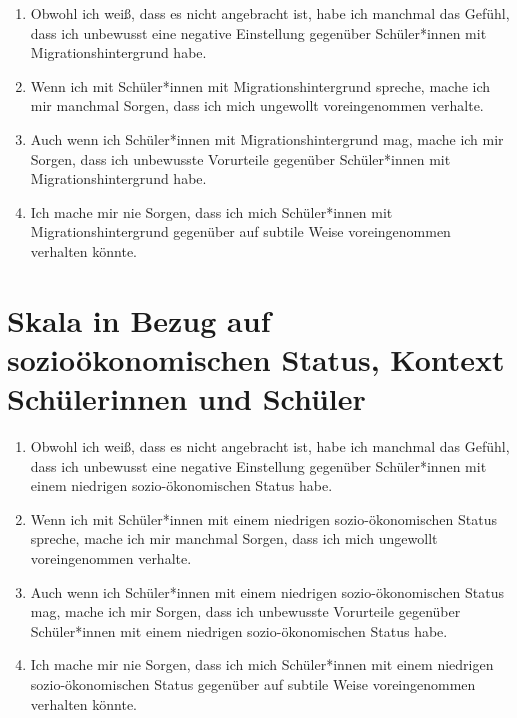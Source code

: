 \begin{enumerate}
	\item Obwohl ich weiß, dass es nicht angebracht ist, habe ich manchmal das Gefühl, dass ich unbewusst eine negative Einstellung gegenüber Schüler*innen mit Migrationshintergrund habe.
	
	\item Wenn ich mit Schüler*innen mit Migrationshintergrund spreche, mache ich mir manchmal Sorgen, dass ich mich ungewollt voreingenommen verhalte.
	
	\item Auch wenn ich Schüler*innen mit Migrationshintergrund mag, mache ich mir Sorgen, dass ich unbewusste Vorurteile gegenüber Schüler*innen mit Migrationshintergrund habe.
	
	\item Ich mache mir nie Sorgen, dass ich mich Schüler*innen mit Migrationshintergrund gegenüber auf subtile Weise voreingenommen verhalten könnte.
\end{enumerate}


\section*{Skala in Bezug auf sozioökonomischen Status, Kontext Schülerinnen und Schüler}
\label{app:skala-sozoek-sus}

\begin{enumerate}
	\item Obwohl ich weiß, dass es nicht angebracht ist, habe ich manchmal das Gefühl, dass ich unbewusst eine negative Einstellung gegenüber Schüler*innen mit einem niedrigen sozio-ökonomischen Status habe.
	
	\item Wenn ich mit Schüler*innen mit einem niedrigen sozio-ökonomischen Status spreche, mache ich mir manchmal Sorgen, dass ich mich ungewollt voreingenommen verhalte.
	
	\item Auch wenn ich Schüler*innen mit einem niedrigen sozio-ökonomischen Status mag, mache ich mir Sorgen, dass ich unbewusste Vorurteile gegenüber Schüler*innen mit einem niedrigen sozio-ökonomischen Status habe.
	
	\item Ich mache mir nie Sorgen, dass ich mich Schüler*innen mit einem niedrigen sozio-ökonomischen Status gegenüber auf subtile Weise voreingenommen verhalten könnte.
\end{enumerate}



